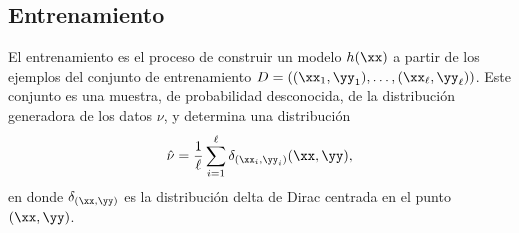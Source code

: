 %
%
\subsection{Entrenamiento}
%
El entrenamiento es el proceso de construir un modelo $h(\xx)$ a
partir de los ejemplos del conjunto de entrenamiento
$D=\left((\xx_1,\yy_1),\ldots,(\xx_\ell,\yy_\ell)\right)$.
Este conjunto es una muestra, de probabilidad desconocida, de la
distribución generadora de los datos $\nu$, y determina una
distribución 
%
\begin{align}
  \hat{\nu}=\frac{1}{\ell}\sum_{i=1}^{\ell}\delta_{(\xx_i,\yy_i)}(\xx,\yy),
\end{align}
%
en donde $\delta_{(\xx,\yy)}$ es la distribución delta de Dirac
centrada en el punto $(\xx,\yy)$.
